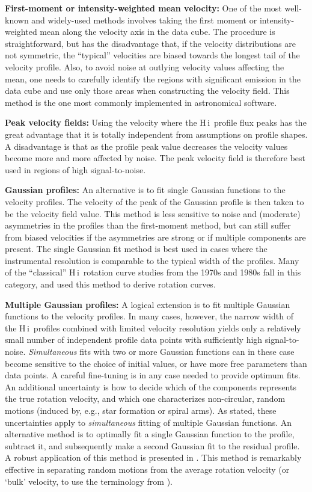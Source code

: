 \documentclass[usenatbib,usegraphicx,apjfonts,floatfix]{emulateapj}
\newcommand{\HI}{H\,{\sc i}}
\begin{document}
{\bf First-moment or intensity-weighted mean velocity:} One of the
most well-known and widely-used methods involves taking the first
moment or intensity-weighted mean along the velocity axis in the data
cube. The procedure is straightforward, but has the disadvantage that,
if the velocity distributions are not symmetric, the ``typical''
velocities are biased towards the longest tail of the velocity
profile.  Also, to avoid noise at outlying velocity values affecting
the mean, one needs to carefully identify the regions with significant
emission in the data cube and use only those areas when constructing
the velocity field.  This method is the one most commonly implemented
in astronomical software.

{\bf Peak velocity fields: } Using the velocity where the \HI\ profile
flux peaks has the great advantage that it is totally independent from
assumptions on profile shapes. A disadvantage is that as the profile
peak value decreases the velocity values become more and more affected
by noise. The peak velocity field is therefore best used in regions of
high signal-to-noise.

{\bf Gaussian profiles: } An alternative is to fit single Gaussian
functions to the velocity profiles. The velocity of the peak of the
Gaussian profile is then taken to be the velocity field value. This
method is less sensitive to noise and (moderate) asymmetries in the
profiles than the first-moment method, but can still suffer from
biased velocities if the asymmetries are strong or if multiple
components are present.  The single Gaussian fit method is best used
in cases where the instrumental resolution is comparable to the
typical width of the profiles. Many of the ``classical'' \HI\ rotation
curve studies from the 1970s and 1980s fall in this category, and used
this method to derive rotation curves.

{\bf Multiple Gaussian profiles: } A logical extension is to fit
multiple Gaussian functions to the velocity profiles.  In many cases,
however, the narrow width of the \HI\ profiles combined with limited
velocity resolution yields only a relatively small number of
independent profile data points with sufficiently high
signal-to-noise.  \emph{Simultaneous} fits with two or more Gaussian
functions can in these case become sensitive to the choice of initial
values, or have more free parameters than data points. A careful
fine-tuning is in any case needed to provide optimum fits. An
additional uncertainty is how to decide which of the components
represents the true rotation velocity, and which one characterizes
non-circular, random motions (induced by, e.g., star formation or
spiral arms).  As stated, these uncertainties apply to
\emph{simultaneous} fitting of multiple Gaussian functions.  An
alternative method is to optimally fit a single Gaussian function to
the profile, subtract it, and subsequently make a second Gaussian fit
to the residual profile.  A robust application of this method is
presented in \citet{oh2007}.  This method is remarkably effective in
separating random motions from the average rotation velocity (or
`bulk' velocity, to use the terminology from \citealt{oh2007}).
\end{document}
